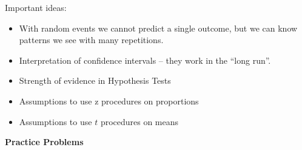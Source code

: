 Important ideas:
\begin{itemize}
\item With random events we cannot predict a single outcome, but 
  we can know patterns we see with many repetitions.\vspace{.2cm}
\item  Interpretation of  confidence intervals -- they work in the
  ``long run''.\vspace{.2cm}
\item  Strength of evidence in Hypothesis Tests\vspace{.2cm}
\item  Assumptions to use z procedures on proportions\vspace{.2cm}
\item  Assumptions to use $t$ procedures on means \vspace{.2cm}
\end{itemize}
\begin{center}
  {\bf Practice Problems}
\end{center}
